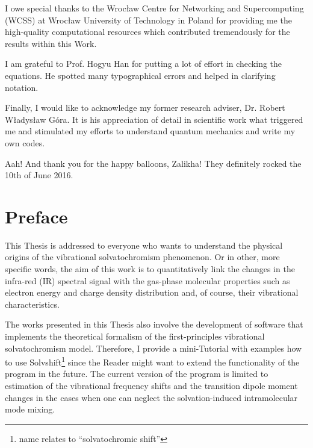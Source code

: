 \documentclass[a4paper,titlepage,twoside,fleqn,12pt]{book}
\begin{document}
{I owe special thanks to the Wroc{\l}aw Centre for Networking and Supercomputing
(WCSS) at Wroc{\l}aw University of Technology in Poland for providing me 
the high\hyp{}quality computational resources which contributed tremendously
for the results within this Work.

I am grateful to Prof. Hogyu Han for putting a lot of effort in checking
the equations. He spotted many typographical errors and helped
in clarifying notation.

Finally, I would like to acknowledge my former research adviser, Dr. Robert W{\l}adys{\l}aw G{\'o}ra.
It is his appreciation of detail in scientific work what triggered me and stimulated
my efforts to understand quantum mechanics and write my own codes.

Aah! And thank you for the happy balloons, Zalikha! They definitely rocked the 10th of June 2016.


}
\chapter{Preface}

This Thesis is addressed to everyone who wants to understand the physical
origins of the vibrational solvatochromism phenomenon. Or in other, more specific words, 
the aim of this work is to quantitatively link the changes in the infra\hyp{}red (IR)
spectral signal with the gas\hyp{}phase molecular properties such as electron energy and charge
density distribution and, of course, their vibrational characteristics. 

The works presented in this Thesis also involve the development of software
that implements the theoretical formalism of the first\hyp{}principles vibrational solvatochromism model.
Therefore, I provide a mini\hyp{}Tutorial with examples how to use {\sc Solvshift}\footnote{name relates to 
``solvatochromic shift''} 
since the Reader might want to extend the functionality of the program in the future.
The current version of the program is limited to estimation of the vibrational frequency 
shifts and the transition dipole moment changes in the cases when one can 
neglect the solvation\hyp{}induced intramolecular mode mixing.
\tableofcontents
\mainmatter
\end{document}

